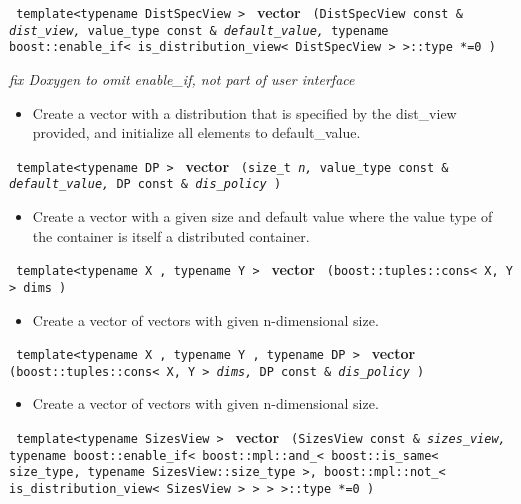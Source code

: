 \noindent
\texttt{%
template<typename DistSpecView >
}
\newline
\textbf{vector}%
\texttt{%
(DistSpecView const \&
\textit{dist\_view,}%
value\_type const \&
\textit{default\_value,}%
typename boost::enable\_if< is\_distribution\_view< DistSpecView > >::type *=0
)
}

\vspace{0.4cm} \emph{fix Doxygen to omit enable\_if, not part of user interface}

\begin{itemize}
\item
Create a vector with a distribution that is specified by the dist\_view provided, and initialize all elements to default\_value. 
\end{itemize}
 
\noindent
\texttt{%
template<typename DP >
}
\newline
\textbf{vector}%
\texttt{%
(size\_t 
\textit{n,}%
value\_type const \&
\textit{default\_value,}%
DP const \&
\textit{dis\_policy}%
)
}

\begin{itemize}
\item
Create a vector with a given size and default value where the value type of the container is itself a distributed container. 
\end{itemize}
 
\noindent
\texttt{%
template<typename X , typename Y >
}
\newline
\textbf{vector}%
\texttt{%
(boost::tuples::cons< X, Y > dims
)
}

\begin{itemize}
\item
Create a vector of vectors with given n-dimensional size. 
\end{itemize}
 
\noindent
\texttt{%
template<typename X , typename Y , typename DP >
}
\newline
\textbf{vector}%
\texttt{%
(boost::tuples::cons< X, Y > 
\textit{dims,}%
DP const \&
\textit{dis\_policy}%
)
}

\begin{itemize}
\item
Create a vector of vectors with given n-dimensional size. 
\end{itemize}
 
\noindent
\texttt{%
template<typename SizesView >
}
\newline
\textbf{vector}%
\texttt{%
(SizesView const \&
\textit{sizes\_view,}%
typename boost::enable\_if< boost::mpl::and\_< boost::is\_same< size\_type, 
typename SizesView::size\_type >, boost::mpl::not\_< is\_distribution\_view< SizesView > > > >::type *=0
)
}

